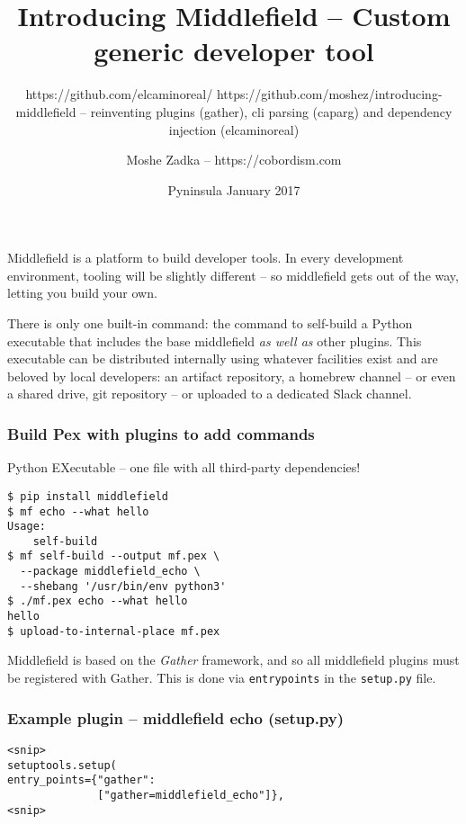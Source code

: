 \usepackage[utf8]{inputenc}
\usepackage{listings}
\usepackage{textcomp}

\title{Introducing Middlefield -- Custom generic developer tool}
\subtitle{https://github.com/elcaminoreal/ https://github.com/moshez/introducing-middlefield -- reinventing plugins (gather), cli parsing (caparg) and dependency injection (elcaminoreal)}
\author{Moshe Zadka -- https://cobordism.com}
\date{Pyninsula January 2017}
 

 
\begin{titlepage}
\maketitle
\end{titlepage}

\frame{\titlepage}

Middlefield is a platform to build developer tools.
In every development environment,
tooling will be slightly different --
so middlefield gets out of the way,
letting you build your own.

There is only one built-in command:
the command to self-build a Python executable that includes
the base middlefield
{\em as well as} 
other plugins.
This executable can be distributed internally using whatever facilities
exist and are beloved by local developers:
an artifact repository,
a homebrew channel --
or even a shared drive, git repository --
or uploaded to a dedicated Slack channel.

\begin{frame}[fragile]
\frametitle{Build Pex with plugins to add commands}
Python EXecutable -- one file with all third-party dependencies!
\begin{lstlisting}
$ pip install middlefield
$ mf echo --what hello
Usage:
    self-build
$ mf self-build --output mf.pex \
  --package middlefield_echo \
  --shebang '/usr/bin/env python3'
$ ./mf.pex echo --what hello 
hello
$ upload-to-internal-place mf.pex
\end{lstlisting}
\end{frame}

Middlefield is based on the {\em Gather} framework,
and so all middlefield plugins must be registered
with Gather.
This is done via \texttt{entry{\textunderscore}points} in the
\texttt{setup.py}
file.

\begin{frame}[fragile]
\frametitle{Example plugin -- middlefield echo (setup.py)}
\begin{lstlisting}
<snip>
setuptools.setup(
entry_points={"gather":
              ["gather=middlefield_echo"]},
<snip>
\end{lstlisting}
\end{frame}

